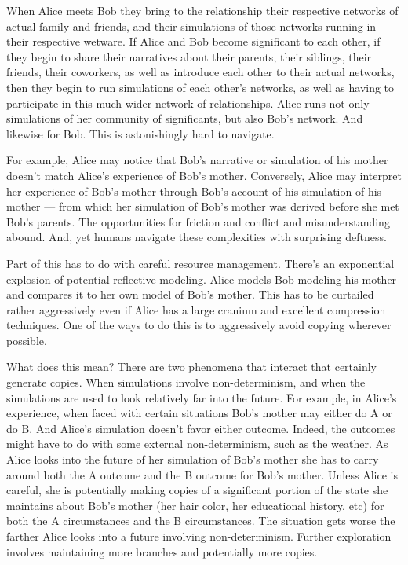 When Alice meets Bob they bring to the relationship their respective networks of actual family and friends, and their simulations of those networks running in their respective wetware. If Alice and Bob become significant to each other, if they begin to share their narratives about their parents, their siblings, their friends, their coworkers, as well as introduce each other to their actual networks, then they begin to run simulations of each other's networks, as well as having to participate in this much wider network of relationships. Alice runs not only simulations of her community of significants, but also Bob's network. And likewise for Bob. This is astonishingly hard to navigate.

For example, Alice may notice that Bob's narrative or simulation of his mother doesn't match Alice's experience of Bob's mother. Conversely, Alice may interpret her experience of Bob's mother through Bob's account of his simulation of his mother --- from which her simulation of Bob's mother was derived before she met Bob's parents. The opportunities for friction and conflict and misunderstanding abound. And, yet humans navigate these complexities with surprising deftness.

Part of this has to do with careful resource management. There's an exponential explosion of potential reflective modeling. Alice models Bob modeling his mother and compares it to her own model of Bob's mother. This has to be curtailed rather aggressively even if Alice has a large cranium and excellent compression techniques. One of the ways to do this is to aggressively avoid copying wherever possible.

What does this mean? There are two phenomena that interact that certainly generate copies. When simulations involve non-determinism, and when the simulations are used to look relatively far into the future. For example, in Alice's experience, when faced with certain situations Bob's mother may either do A or do B. And Alice's simulation doesn't favor either outcome. Indeed, the outcomes might have to do with some external non-determinism, such as the weather. As Alice looks into the future of her simulation of Bob's mother she has to carry around both the A outcome and the B outcome for Bob's mother. Unless Alice is careful, she is potentially making copies of a significant portion of the state she maintains about Bob's mother (her hair color, her educational history, etc) for both the A circumstances and the B circumstances. The situation gets worse the farther Alice looks into a future involving non-determinism. Further exploration involves maintaining more branches and potentially more copies.


